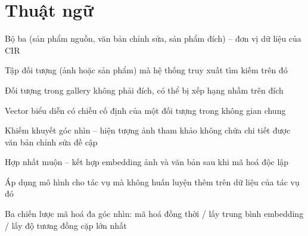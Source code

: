\section*{Thuật ngữ}
\begin{abbrv}
    \item[Triplet] Bộ ba (sản phẩm nguồn, văn bản chỉnh sửa, sản phẩm đích) -- đơn vị dữ liệu của CIR
    \item[Gallery] Tập đối tượng (ảnh hoặc sản phẩm) mà hệ thống truy xuất tìm kiếm trên đó
    \item[Distractor] Đối tượng trong gallery không phải đích, có thể bị xếp hạng nhầm trên đích
    \item[Embedding] Vector biểu diễn có chiều cố định của một đối tượng trong không gian chung
    \item[View Incompleteness] Khiếm khuyết góc nhìn -- hiện tượng ảnh tham khảo không chứa chi tiết được văn bản chỉnh sửa đề cập
    \item[Late fusion] Hợp nhất muộn -- kết hợp embedding ảnh và văn bản sau khi mã hoá độc lập
    \item[Zero-shot] Áp dụng mô hình cho tác vụ mà không huấn luyện thêm trên dữ liệu của tác vụ đó
    \item[Joint / MeanPool / MaxSim] Ba chiến lược mã hoá đa góc nhìn: mã hoá đồng thời / lấy trung bình embedding / lấy độ tương đồng cặp lớn nhất
\end{abbrv}
